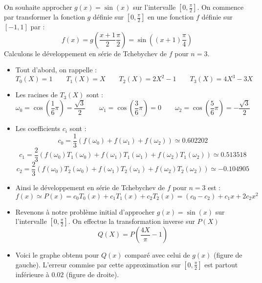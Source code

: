 \documentclass[11pt,class=report,crop=false]{standalone}
\begin{document}
\begin{exemple}
On souhaite approcher $g(x) = \sin(x)$ sur l'intervalle $[0, \frac\pi2]$. 
On commence par transformer la fonction $g$ définie sur $[0, \frac\pi2]$ en une fonction 
$f$ définie sur $[-1,1]$ par :
$$f(x) = g\left( \frac{x+1}{2}\frac{\pi}{2}\right) = \sin\left( (x+1)\frac{\pi}{4} \right)$$
Calculons le développement en série de Tchebychev de $f$ pour $n=3$.
\begin{itemize}
  \item Tout d'abord, on rappelle :
$$T_0(X) = 1 \qquad T_1(X) = X \qquad T_2(X) = 2X^2-1 \qquad T_3(X) = 4X^3-3X$$

  \item Les racines de $T_3(X)$ sont :
$$
\omega_0 = \cos \left(\frac{1}{6}\pi\right) = \frac{\sqrt3}{2} \qquad 
\omega_1 = \cos \left(\frac{3}{6}\pi\right) = 0 \qquad 
\omega_2 = \cos \left(\frac{5}{6}\pi\right) = -\frac{\sqrt3}{2}
$$

  \item Les coefficients $c_i$ sont : 
$$c_0 = \frac{1}{3} \left( f(\omega_0) + f(\omega_1) + f(\omega_2) \right) 
\simeq 0.602202$$
$$c_1 = \frac{2}{3} \left( f(\omega_0) T_1(\omega_0) + f(\omega_1) T_1(\omega_1) + f(\omega_2) T_1(\omega_2) \right) 
\simeq 0.513518$$
$$c_2 = \frac{2}{3} \left( f(\omega_0) T_2(\omega_0) + f(\omega_1) T_2(\omega_1) + f(\omega_2) T_2(\omega_2) \right) 
\simeq -0.104905$$

  \item Ainsi le développement en série de Tchebychev de $f$ pour $n=3$ est :
$$f(x) \simeq P(x) = c_0 T_0(x) + c_1 T_1(x) + c_2 T_2(x)
= (c_0-c_2) + c_1 x +2c_2x^2$$

  \item Revenons à notre problème initial d'approcher $g(x) = \sin(x)$ sur l'intervalle $[0, \frac\pi2]$. On effectue la transformation inverse sur $P(X)$  
  $$Q(X) = P\left( \frac{4X}{\pi} -1 \right) $$


  \item Voici le graphe obtenu pour $Q(x)$ comparé avec celui de $g(x)$ (figure de gauche).
  L'erreur commise par cette approximation sur $[0, \frac\pi2]$ est partout inférieure à $0.02$ (figure de droite).


\end{itemize}
\end{exemple}
\end{document}
